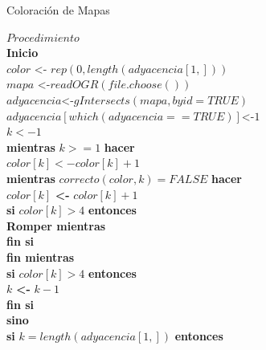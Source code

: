 \documentclass[a4paper]{article}
\begin{document}
\begin{algorithm}
	\caption{Coloración de Mapas\label{ALG1_3}}
	\hspace{0.1cm} $Procedimiento$\\
	\hspace{0.1cm} \textbf{Inicio}\\
	\hspace{0.1cm} $color$ <- $rep(0,length(adyacencia[1,]))$\\
	\hspace{0.1cm} $mapa$ <-$readOGR(file.choose())$\\
	\hspace{0.1cm} $adyacencia$<-$gIntersects(mapa,byid=TRUE)$\\
	\hspace{0.1cm} $adyacencia[which(adyacencia==TRUE)]$<-$1$\\
	\hspace{0.1cm} $k<-1$\\
	\hspace{0.1cm} \textbf{mientras} $k>=1$ \textbf{hacer}\\
	\hspace{0.6cm} $color[k]<-color[k]+1$\\
	\hspace{0.6cm} \textbf{mientras} $correcto(color,k)=FALSE$ \textbf{hacer}\\
	\hspace{1.1cm} $color[k]$ \textbf{<-} $color[k]+1$\\
	\hspace{1.1cm} \textbf{si} $color[k]>4$ \textbf{entonces}\\
	\hspace{1.6cm} \textbf{Romper mientras}\\
	\hspace{1.1cm} \textbf{fin si}\\
	\hspace{0.6cm} \textbf{fin mientras}\\
	\hspace{0.6cm} \textbf{si} $color[k]>4$ \textbf{entonces}\\
	\hspace{1.1cm} $k$ \textbf{<-} $k-1$\\
	\hspace{0.6cm} \textbf{fin si}\\
	\hspace{0.6cm} \textbf{sino}\\
	\hspace{1.1cm} \textbf{si} $k = length(adyacencia[1,])$ \textbf{entonces}\\

\end{algorithm}
\end{document}
